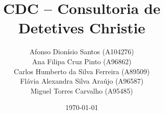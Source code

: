 




\title{CDC – Consultoria de \\ Detetives Christie}

\author{
    Afonso Dionísio Santos (A104276) \\
  \quad
    Ana Filipa Cruz Pinto (A96862) \\
  \quad
    Carlos Humberto da Silva Ferreira (A89509) \\
  \quad
    Flávia Alexandra Silva Araújo (A96587) \\
  \quad
    Miguel Torres Carvalho (A95485)
}


\date{\today}

\newcommand{\Course}{Licenciatura em Engenharia Informática}

\newcommand{\Department}{Escola de Engenharia}

\newcommand{\UniName}{Universidade do Minho}

\newcommand{\UniPic}{\texttt{[image: images/uminho.png]}}

\newcommand{\University}{
    \begin{flushleft}
        \UniPic
    \end{flushleft}
    \textcolor{gray}{\small\textbf{\textsf{\UniName}}}\par
    \textcolor{gray!80!white}{\small{\textsf{\Department}}}\par
    \textcolor{gray!70!white}{\small{\textsf{\Course}}}
}

